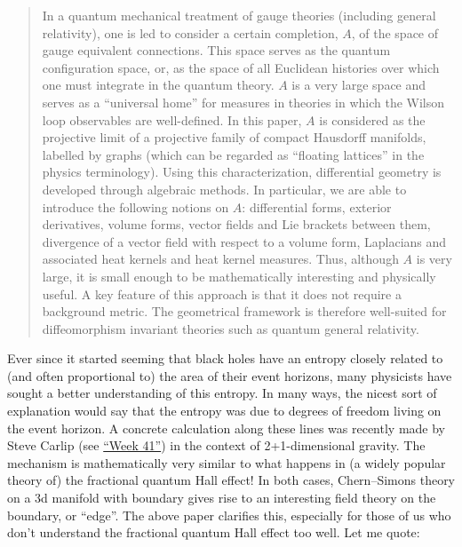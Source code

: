 \documentclass{article}
\def\tightlist{}
\renewcommand{\texttt}[1]{%
  \begingroup
  \ttfamily
  \begingroup\lccode`~=`/\lowercase{\endgroup\def~}{/\discretionary{}{}{}}%
  \begingroup\lccode`~=`[\lowercase{\endgroup\def~}{[\discretionary{}{}{}}%
  \begingroup\lccode`~=`.\lowercase{\endgroup\def~}{.\discretionary{}{}{}}%
  \catcode`/=\active\catcode`[=\active\catcode`.=\active
  \scantokens{#1\noexpand}%
  \endgroup
}
\begin{document}
\begin{quote}
In a quantum mechanical treatment of gauge theories (including general
relativity), one is led to consider a certain completion, \(A\), of the
space of gauge equivalent connections. This space serves as the quantum
configuration space, or, as the space of all Euclidean histories over
which one must integrate in the quantum theory. \(A\) is a very large
space and serves as a ``universal home'' for measures in theories in
which the Wilson loop observables are well-defined. In this paper, \(A\)
is considered as the projective limit of a projective family of compact
Hausdorff manifolds, labelled by graphs (which can be regarded as
``floating lattices'' in the physics terminology). Using this
characterization, differential geometry is developed through algebraic
methods. In particular, we are able to introduce the following notions
on \(A\): differential forms, exterior derivatives, volume forms, vector
fields and Lie brackets between them, divergence of a vector field with
respect to a volume form, Laplacians and associated heat kernels and
heat kernel measures. Thus, although \(A\) is very large, it is small
enough to be mathematically interesting and physically useful. A key
feature of this approach is that it does not require a background
metric. The geometrical framework is therefore well-suited for
diffeomorphism invariant theories such as quantum general relativity.
\end{quote}


Ever since it started seeming that black holes have an entropy closely
related to (and often proportional to) the area of their event horizons,
many physicists have sought a better understanding of this entropy. In
many ways, the nicest sort of explanation would say that the entropy was
due to degrees of freedom living on the event horizon. A concrete
calculation along these lines was recently made by Steve Carlip (see
\protect\hyperlink{week41}{``Week 41''}) in the context of
2+1-dimensional gravity. The mechanism is mathematically very similar to
what happens in (a widely popular theory of) the fractional quantum Hall
effect! In both cases, Chern--Simons theory on a 3d manifold with
boundary gives rise to an interesting field theory on the boundary, or
``edge''. The above paper clarifies this, especially for those of us who
don't understand the fractional quantum Hall effect too well. Let me
quote:
\end{document}
